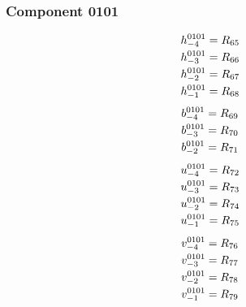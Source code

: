\documentclass[11pt,a4paper]{article}
\begin{document}
\subsubsection{Component 0101}
\begin{equation}
\shortstack[l]{$\displaystyle h^{0101}_{-4}=R_{65}$\\
$\displaystyle h^{0101}_{-3}=R_{66}$\\
$\displaystyle h^{0101}_{-2}=R_{67}$\\
$\displaystyle h^{0101}_{-1}=R_{68}$}
\label{eq:cat-map-18}
\end{equation}
\begin{equation}
\shortstack[l]{$\displaystyle b^{0101}_{-4}=R_{69}$\\
$\displaystyle b^{0101}_{-3}=R_{70}$\\
$\displaystyle b^{0101}_{-2}=R_{71}$}
\label{eq:cat-map-19}
\end{equation}
\begin{equation}
\shortstack[l]{$\displaystyle u^{0101}_{-4}=R_{72}$\\
$\displaystyle u^{0101}_{-3}=R_{73}$\\
$\displaystyle u^{0101}_{-2}=R_{74}$\\
$\displaystyle u^{0101}_{-1}=R_{75}$}
\label{eq:cat-map-20}
\end{equation}
\begin{equation}
\shortstack[l]{$\displaystyle v^{0101}_{-4}=R_{76}$\\
$\displaystyle v^{0101}_{-3}=R_{77}$\\
$\displaystyle v^{0101}_{-2}=R_{78}$\\
$\displaystyle v^{0101}_{-1}=R_{79}$}
\label{eq:cat-map-21}
\end{equation}
\end{document}
